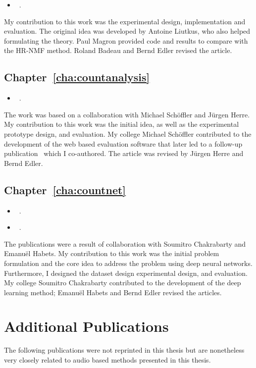 \begin{itemize}
  \item[\cite{stoeter16}] ~.
\end{itemize}
\noindent
My contribution to this work was the experimental design, implementation and evaluation.
The original idea was developed by Antoine Liutkus, who also helped formulating the theory. Paul Magron provided code and results to compare with the HR-NMF method. Roland Badeau and Bernd Edler revised the article.

\subsection*{Chapter~\ref{cha:countanalysis}}

\begin{itemize}
  \item[\cite{stoeter13}] ~.
\end{itemize}
\noindent
The work was based on a collaboration with Michael Schöffler and Jürgen Herre.
My contribution to this work was the initial idea, as well as the experimental prototype design, and evaluation.
My college Michael Schöffler contributed to the development of the web based evaluation software that later led to a follow-up publication~\cite{schoeffler13} which I co-authored. The article was revised by Jürgen Herre and Bernd Edler.

\subsection*{Chapter~\ref{cha:countnet}}

\begin{itemize}
  \item[\cite{stoeter19}] ~.
  \item[\cite{stoeter18}] ~.
\end{itemize}
\noindent
The publications were a result of collaboration with Soumitro Chakrabarty and Emanuël Habets. 
My contribution to this work was the initial problem formulation and the core idea to address the problem using deep neural networks. Furthermore, I designed the dataset design experimental design, and evaluation.
My college Soumitro Chakrabarty contributed to the development of the deep learning method; Emanuël Habets and Bernd Edler revised the articles.


\section*{Additional Publications}
The following publications were not reprinted in this thesis but are nonetheless very closely related to audio based methods presented in this thesis.
\begin{refsection}
\nocite{*}
\printbibliography[env=numbered+bold, heading=none,resetnumbers=true, sorting=ynt]
\newrefcontext[sorting=nyt]
\end{refsection}

